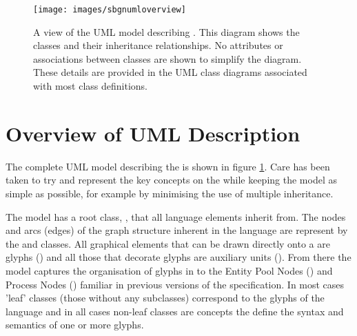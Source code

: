 \begin{figure}
\texttt{[image: images/sbgnumloverview]}
\caption{A view of the UML model describing \PDl. This diagram shows
  the classes and their inheritance relationships. No attributes or
  associations between classes are shown to simplify the
  diagram. These details are provided in the UML class diagrams
  associated with most class definitions.}
\label{fig:techref:sbgnoverviewuml}
\end{figure}

\section{Overview of UML Description}

The complete UML model describing the \PDl is shown in figure
\ref{fig:techref:sbgnoverviewuml}. Care has been taken to try and
represent the key concepts on the \PDl while keeping the model as
simple as possible, for example by minimising the use of multiple
inheritance.

The model has a root class, , that all language
elements inherit from. The nodes and arcs (edges) of the graph
structure inherent in the language are represent by the
 and  classes. All graphical
elements that can be drawn directly onto a \PDm are glyphs
() and all those that decorate glyphs are
auxiliary units (). From there the model
captures the organisation of glyphs in to the Entity Pool Nodes
() and Process Nodes
() familiar in previous versions of the \PDl
specification.  In most cases 'leaf' classes (those without any
subclasses) correspond to the glyphs of the language and in all cases
non-leaf classes are concepts the define the syntax and semantics of
one or more glyphs.


